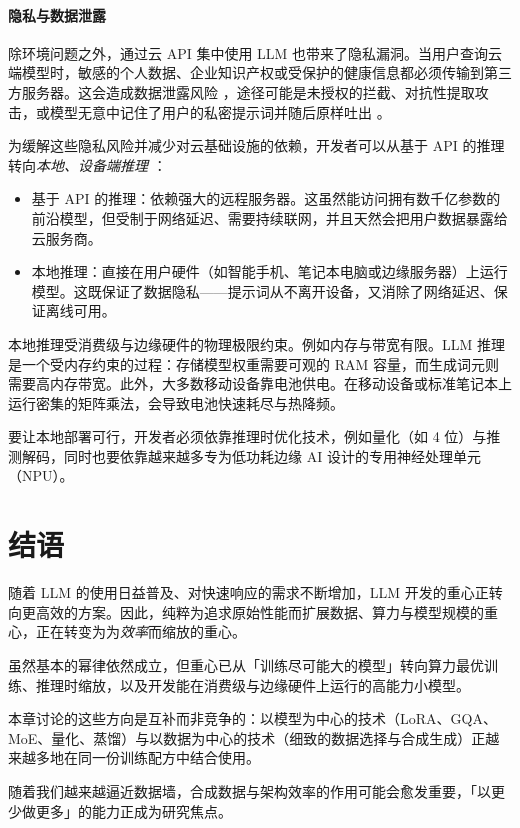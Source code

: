 \paragraph{隐私与数据泄露}
除环境问题之外，通过云 API 集中使用 LLM 也带来了隐私漏洞。当用户查询云端模型时，敏感的个人数据、企业知识产权或受保护的健康信息都必须传输到第三方服务器。这会造成数据泄露风险 \citep{aiyappa-etal-2023-trust, li2024opensourcedatacontamination}，途径可能是未授权的拦截、对抗性提取攻击，或模型无意中记住了用户的私密提示词并随后原样吐出 \citep{chen2024janus, maini2024llm, liu2022membership}。

为缓解这些隐私风险并减少对云基础设施的依赖，开发者可以从基于 API 的推理转向\emph{本地、设备端推理} \citep{qu2025mobile}：
\begin{itemize}
    \item 基于 API 的推理：依赖强大的远程服务器。这虽然能访问拥有数千亿参数的前沿模型，但受制于网络延迟、需要持续联网，并且天然会把用户数据暴露给云服务商。
    \item 本地推理：直接在用户硬件（如智能手机、笔记本电脑或边缘服务器）上运行模型。这既保证了数据隐私——提示词从不离开设备，又消除了网络延迟、保证离线可用。
\end{itemize}
%
本地推理受消费级与边缘硬件的物理极限约束。例如内存与带宽有限。LLM 推理是一个受内存约束的过程：存储模型权重需要可观的 RAM 容量，而生成词元则需要高内存带宽。此外，大多数移动设备靠电池供电。在移动设备或标准笔记本上运行密集的矩阵乘法，会导致电池快速耗尽与热降频。

要让本地部署可行，开发者必须依靠推理时优化技术，例如量化（如 4 位）与推测解码，同时也要依靠越来越多专为低功耗边缘 AI 设计的专用神经处理单元（NPU）。


\section{结语}
随着 LLM 的使用日益普及、对快速响应的需求不断增加，LLM 开发的重心正转向更高效的方案。因此，纯粹为追求原始性能而扩展数据、算力与模型规模的重心，正在转变为为\emph{效率}而缩放的重心。 

虽然基本的幂律依然成立，但重心已从「训练尽可能大的模型」转向算力最优训练、推理时缩放，以及开发能在消费级与边缘硬件上运行的高能力小模型。 

本章讨论的这些方向是互补而非竞争的：以模型为中心的技术（LoRA、GQA、MoE、量化、蒸馏）与以数据为中心的技术（细致的数据选择与合成生成）正越来越多地在同一份训练配方中结合使用。 

随着我们越来越逼近数据墙，合成数据与架构效率的作用可能会愈发重要，「以更少做更多」的能力正成为研究焦点。




